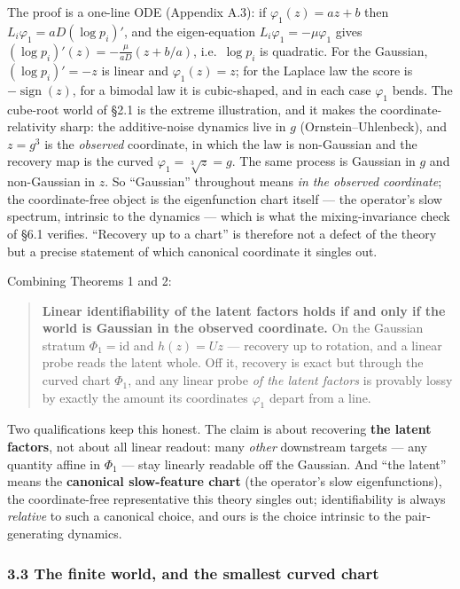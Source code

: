 \documentclass[
  letterpaper,
  11pt]{article}
\theoremstyle{plain}
\theoremstyle{definition}
\theoremstyle{remark}
\begin{document}
The proof is a one-line ODE (Appendix A.3): if \(\varphi_1(z)=az+b\) then \(L_i\varphi_1 = aD(\log p_i)'\), and the eigen-equation \(L_i\varphi_1=-\mu\varphi_1\) gives \((\log p_i)'(z) = -\tfrac{\mu}{aD}(z+b/a)\), i.e.~\(\log p_i\) is quadratic. For the Gaussian, \((\log p_i)' = -z\) is linear and \(\varphi_1(z)=z\); for the Laplace law the score is \(-\operatorname{sign}(z)\), for a bimodal law it is cubic-shaped, and in each case \(\varphi_1\) bends. The cube-root world of §2.1 is the extreme illustration, and it makes the coordinate-relativity sharp: the additive-noise dynamics live in \(g\) (Ornstein--Uhlenbeck), and \(z=g^3\) is the \emph{observed} coordinate, in which the law is non-Gaussian and the recovery map is the curved \(\varphi_1=\sqrt[3]{z}=g\). The same process is Gaussian in \(g\) and non-Gaussian in \(z\). So ``Gaussian'' throughout means \emph{in the observed coordinate}; the coordinate-free object is the eigenfunction chart itself --- the operator's slow spectrum, intrinsic to the dynamics --- which is what the mixing-invariance check of §6.1 verifies. ``Recovery up to a chart'' is therefore not a defect of the theory but a precise statement of which canonical coordinate it singles out.

Combining Theorems 1 and 2:

\begin{quote}
\textbf{Linear identifiability of the latent factors holds if and only if the world is Gaussian in the observed coordinate.} On the Gaussian stratum \(\Phi_1=\mathrm{id}\) and \(h(z)=Uz\) --- recovery up to rotation, and a linear probe reads the latent whole. Off it, recovery is exact but through the curved chart \(\Phi_1\), and any linear probe \emph{of the latent factors} is provably lossy by exactly the amount its coordinates \(\varphi_1\) depart from a line.
\end{quote}

Two qualifications keep this honest. The claim is about recovering \textbf{the latent factors}, not about all linear readout: many \emph{other} downstream targets --- any quantity affine in \(\Phi_1\) --- stay linearly readable off the Gaussian. And ``the latent'' means the \textbf{canonical slow-feature chart} (the operator's slow eigenfunctions), the coordinate-free representative this theory singles out; identifiability is always \emph{relative} to such a canonical choice, and ours is the choice intrinsic to the pair-generating dynamics.

\subsubsection{3.3 The finite world, and the smallest curved chart}\label{the-finite-world-and-the-smallest-curved-chart}
\end{document}
